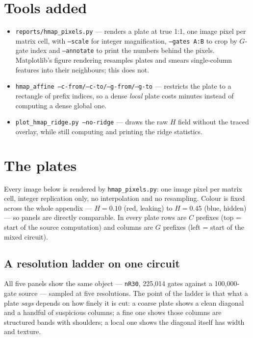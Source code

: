 \documentclass[11pt]{article}
\newcommand{\code}[1]{\texttt{#1}}
\begin{document}
\section{Tools added}

\begin{itemize}
\item \code{reports/hmap\_pixels.py} --- renders a plate at true 1:1, one
image pixel per matrix cell, with \code{--scale} for integer magnification,
\code{--gates A:B} to crop by $G$-gate index and \code{--annotate} to print
the numbers behind the pixels. Matplotlib's figure rendering resamples
plates and smears single-column features into their neighbours; this does
not.
\item \code{hmap\_affine --c-from/--c-to/--g-from/--g-to} --- restricts the
plate to a rectangle of prefix indices, so a dense \emph{local} plate costs
minutes instead of computing a dense global one.
\item \code{plot\_hmap\_ridge.py --no-ridge} --- draws the raw $H$ field
without the traced overlay, while still computing and printing the ridge
statistics.
\end{itemize}

\appendix
\clearpage
\section{The plates}

Every image below is rendered by \code{hmap\_pixels.py}: one image pixel per
matrix cell, integer replication only, no interpolation and no resampling.
Colour is fixed across the whole appendix --- $H = 0.10$ (red, leaking) to
$H = 0.45$ (blue, hidden) --- so panels are directly comparable. In every
plate rows are $C$ prefixes (top = start of the source computation) and
columns are $G$ prefixes (left = start of the mixed circuit).

\subsection{A resolution ladder on one circuit}

All five panels show the same object --- \code{nR30}, 225{,}014 gates
against a 100{,}000-gate source --- sampled at five resolutions. The point
of the ladder is that what a plate \emph{says} depends on how finely it is
cut: a coarse plate shows a clean diagonal and a handful of suspicious
columns; a fine one shows those columns are structured bands with
shoulders; a local one shows the diagonal itself has width and texture.
\end{document}
